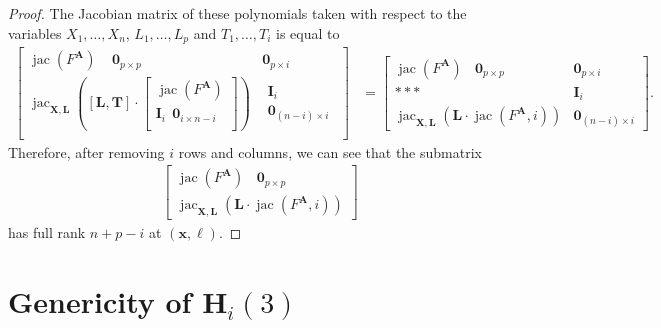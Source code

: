 \documentclass[12pt]{article}
\def\bz{{{\bm 0}}}
\def\mA{{\bm A}}
\def\xb{{\bm x}}
\DeclareMathOperator{\jac}{jac}
\def\bbm{\begin{bmatrix}}
\def\ebm{\end{bmatrix}}
\def\bmat{\begin{matrix}}
\def\emat{\end{matrix}}
\begin{document}
\begin{proof}
  The Jacobian matrix of these polynomials taken with respect to the
  variables $X_1,\dots,X_n$, $L_1,\hdots,L_p$ and $T_1,\hdots,T_i$ is
  equal to
  \begin{align*}
    \left[ 
      \begin{array}{cc}
        \jac(F^{\mA})~~~~~ \bz_{p \times p} & \bz_{p\times i}\\
        \jac_{\bm X,\bm L}\left([\bm L, \bm T ] \cdot 
        \bbm 
        \jac(F^{\mA})\\
        \bm I_i~~\bm 0_{i \times n-i} \\
        \ebm\right) & \bmat \bm I_{i}\\ \bz_{(n-i)\times i} \emat\\
      \end{array}
      \right]
    &=
    \left[ 
      \begin{array}{cc}
        \jac(F^{\mA}) ~~~~ \bz_{p \times p} & \bz_{p\times i} \\
        \ast \ast \ast & \bm I_{i}\\
    \jac_{\bm X,\bm L}\left(\bm L \cdot \jac(F^{\mA},i) \right)& \bz_{(n-i)\times i}
      \end{array}
      \right].
    \end{align*}
    Therefore, after removing $i$ rows and columns, we can see that
    the submatrix
    \begin{align}
    \left[ 
    \begin{array}{c}
    \jac(F^{\mA}) ~~~~ \bz_{p \times p}\\
    \jac_{\bm X,\bm L}\left(\bm L \cdot \jac(F^{\mA},i) \right) 
    \end{array}
    \right]
    \end{align}
    has full rank $n + p-i$ at $(\xb,\bm\ell)$. 
\end{proof}


\section{Genericity of $\textbf{H}_i(3)$}\label{ssec:Hi2}
\end{document}
